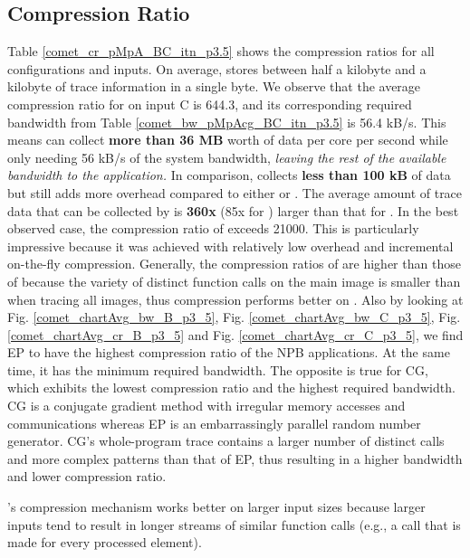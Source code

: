 
\subsection{Compression Ratio}
\label{subsec:cr}
Table \ref{comet_cr_pMpA_BC_itn_p3.5} shows the compression ratios for all configurations and inputs.
%
On average, \parlot stores between half a kilobyte and a kilobyte of trace information in a single byte.
%
We observe that the
average compression ratio for \parlota on input C is 644.3, and its
corresponding required bandwidth from Table
\ref{comet_bw_pMpAcg_BC_itn_p3.5} is 56.4 kB/s.
%
This means \parlot can
collect \textbf{more than 36 MB} worth of data per core per second
while only needing 56 kB/s of the system bandwidth, {\em leaving the rest of the available bandwidth to the application.}
%
In comparison, \callgrind
collects \textbf{less than 100 kB} of data but still adds more
overhead compared to either \parlota or \parlotm .
%
The average amount of trace data that can be collected by \parlota is
\textbf{360x} (85x for \parlotm) larger than that for \callgrind.
%
In the best observed case, the compression ratio of
\parlot exceeds 21000.
%
This is particularly impressive because it was achieved with relatively low overhead and incremental
on-the-fly compression.
%
Generally, the compression ratios of \parlotm are higher than those of \parlota because the variety of distinct function calls on the main image is smaller than when tracing all images, thus compression performs better on \parlotm.
Also by looking at Fig. \ref{comet_chartAvg_bw_B_p3_5}, Fig. \ref{comet_chartAvg_bw_C_p3_5}, Fig. \ref{comet_chartAvg_cr_B_p3_5} and Fig. \ref{comet_chartAvg_cr_C_p3_5}, we find EP to have the highest compression ratio of the NPB applications. At the same time, it has the minimum required bandwidth. The opposite is true for CG, which exhibits the lowest compression ratio and the highest required bandwidth. CG is a conjugate gradient method with irregular memory accesses and communications whereas EP is an embarrassingly parallel random number generator. CG's whole-program trace contains a larger number of distinct calls and more complex patterns than that of EP, thus resulting in a higher bandwidth and lower compression ratio.
%

\parlot's compression mechanism works better on larger input sizes because larger inputs tend to result in longer streams of similar function calls (e.g., a call that is made for every processed element).



